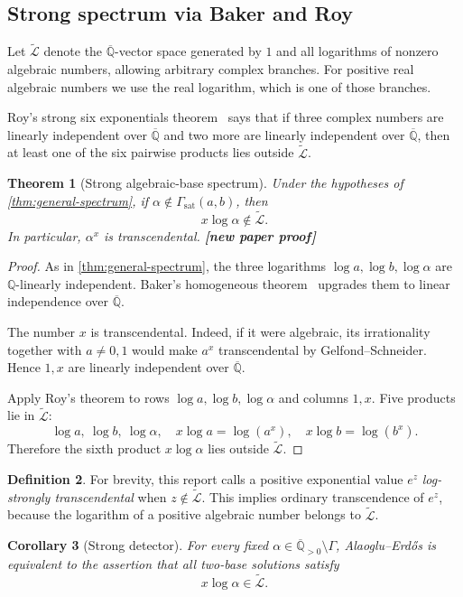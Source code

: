 \documentclass[11pt,oneside]{article}
\newtheorem{theorem}{Theorem}[section]
\newtheorem{corollary}[theorem]{Corollary}
\theoremstyle{definition}
\newtheorem{definition}[theorem]{Definition}
\theoremstyle{remark}
\newcommand{\Q}{\mathbb Q}
\newcommand{\Qbar}{\overline{\mathbb Q}}
\newcommand{\Apos}{\overline{\mathbb Q}_{>0}}
\newcommand{\GammaSat}{\Gamma_{\mathrm{sat}}}
\newcommand{\LL}{\widetilde{\mathcal L}}
\newcommand{\statusnew}{\textcolor{NewViolet}{\textbf{[new paper proof]}}}
\begin{document}
\subsection{Strong spectrum via Baker and Roy}

Let $\LL$ denote the $\Qbar$-vector space generated by $1$ and all logarithms of nonzero
algebraic numbers, allowing arbitrary complex branches.  For positive real algebraic numbers
we use the real logarithm, which is one of those branches.

Roy's strong six exponentials theorem~\cite{Roy1992,Waldschmidt2005} says that if three complex numbers are linearly
independent over $\Qbar$ and two more are linearly independent over $\Qbar$, then at least one
of the six pairwise products lies outside $\LL$.

\begin{theorem}[Strong algebraic-base spectrum]\label{thm:strong-spectrum}
Under the hypotheses of \cref{thm:general-spectrum}, if
$\alpha\notin\GammaSat(a,b)$, then
\[
  x\log\alpha\notin\LL.
\]
In particular, $\alpha^x$ is transcendental.  \statusnew
\end{theorem}

\begin{proof}
As in \cref{thm:general-spectrum}, the three logarithms
$\log a,\log b,\log\alpha$ are $\Q$-linearly independent.  Baker's homogeneous theorem~\cite{Baker1975}
upgrades them to linear independence over $\Qbar$.

The number $x$ is transcendental.  Indeed, if it were algebraic, its irrationality together
with $a\ne0,1$ would make $a^x$ transcendental by Gelfond--Schneider.  Hence $1,x$ are linearly
independent over $\Qbar$.

Apply Roy's theorem to rows $\log a,\log b,\log\alpha$ and columns $1,x$.  Five products lie in
$\LL$:
\[
 \log a,\ \log b,\ \log\alpha,
 \quad x\log a=\log(a^x),
 \quad x\log b=\log(b^x).
\]
Therefore the sixth product $x\log\alpha$ lies outside $\LL$.
\end{proof}

\begin{definition}
For brevity, this report calls a positive exponential value $e^z$ \emph{log-strongly
transcendental} when $z\notin\LL$.  This implies ordinary transcendence of $e^z$, because the
logarithm of a positive algebraic number belongs to $\LL$.
\end{definition}

\begin{corollary}[Strong detector]
For every fixed $\alpha\in\Apos\setminus\Gamma$, Alaoglu--Erd\H{o}s is equivalent to the
assertion that all two-base solutions satisfy
\[
  x\log\alpha\in\LL.
\]
\end{corollary}
\end{document}
